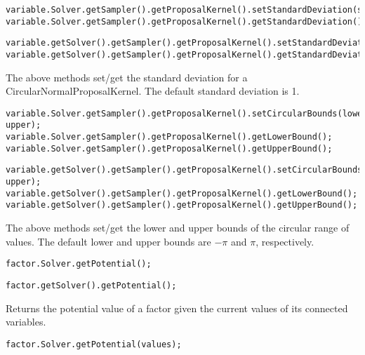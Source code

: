 \ifmatlab
\begin{lstlisting}
variable.Solver.getSampler().getProposalKernel().setStandardDeviation(std);
variable.Solver.getSampler().getProposalKernel().getStandardDeviation();
\end{lstlisting}
\fi

\ifjava
\begin{lstlisting}
variable.getSolver().getSampler().getProposalKernel().setStandardDeviation(std);
variable.getSolver().getSampler().getProposalKernel().getStandardDeviation();
\end{lstlisting}
\fi

The above methods set/get the standard deviation for a CircularNormalProposalKernel.  The default standard deviation is 1.

\ifmatlab
\begin{lstlisting}
variable.Solver.getSampler().getProposalKernel().setCircularBounds(lower, upper);
variable.Solver.getSampler().getProposalKernel().getLowerBound();
variable.Solver.getSampler().getProposalKernel().getUpperBound();
\end{lstlisting}
\fi

\ifjava
\begin{lstlisting}
variable.getSolver().getSampler().getProposalKernel().setCircularBounds(lower, upper);
variable.getSolver().getSampler().getProposalKernel().getLowerBound();
variable.getSolver().getSampler().getProposalKernel().getUpperBound();
\end{lstlisting}
\fi

The above methods set/get the lower and upper bounds of the circular range of values.  The default lower and upper bounds are $-\pi$ and $\pi$, respectively.



\ifmatlab
\begin{lstlisting}
factor.Solver.getPotential();
\end{lstlisting}
\fi

\ifjava
\begin{lstlisting}
factor.getSolver().getPotential();
\end{lstlisting}
\fi

Returns the potential value of a factor given the current values of its connected variables.

\ifmatlab
\begin{lstlisting}
factor.Solver.getPotential(values);
\end{lstlisting}
\fi

